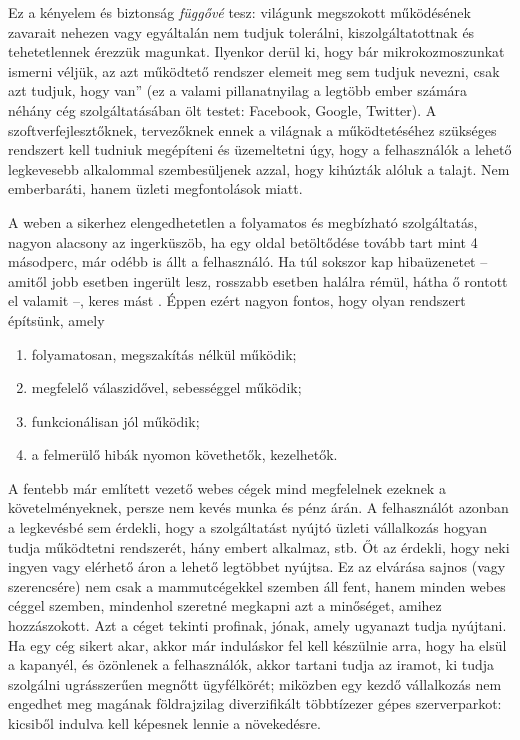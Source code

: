 \documentclass[12pt, a4paper, oneside]{book}
\begin{document}
Ez a kényelem és biztonság \textit{függővé} tesz: világunk megszokott
működésének zavarait nehezen vagy egyáltalán nem tudjuk tolerálni,
kiszolgáltatottnak és tehetetlennek érezzük magunkat. Ilyenkor derül ki, hogy
bár mikrokozmoszunkat ismerni véljük, az azt működtető rendszer elemeit meg sem
tudjuk nevezni, csak azt tudjuk, hogy \glqq{}van\textquotedblright{} (ez a
valami pillanatnyilag a legtöbb ember számára néhány cég szolgáltatásában ölt
testet: Facebook, Google, Twitter). A szoftverfejlesztőknek, tervezőknek ennek
a világnak a működtetéséhez szükséges rendszert kell tudniuk megépíteni és
üzemeltetni úgy, hogy a felhasználók a lehető legkevesebb alkalommal
szembesüljenek azzal, hogy kihúzták alóluk a talajt. Nem emberbaráti, hanem
üzleti megfontolások miatt.

A weben a sikerhez elengedhetetlen a folyamatos és megbízható szolgáltatás,
nagyon alacsony az ingerküszöb, ha egy oldal betöltődése tovább tart mint 4
másodperc, már odébb is állt a felhasználó.  Ha túl sokszor kap hibaüzenetet --
amitől jobb esetben ingerült lesz, rosszabb esetben halálra rémül, hátha ő
rontott el valamit --, keres mást \citep{AkamaiReport}.  Éppen ezért nagyon
fontos, hogy olyan rendszert építsünk, amely 

\begin{enumerate} 
  \item folyamatosan, megszakítás nélkül működik;
  \item megfelelő válaszidővel, sebességgel működik;
  \item funkcionálisan jól működik;
  \item a felmerülő hibák nyomon követhetők, kezelhetők.
\end{enumerate}

A fentebb már említett vezető webes cégek mind megfelelnek ezeknek a
követelményeknek, persze nem kevés munka és pénz árán. A felhasználót azonban a
legkevésbé sem érdekli, hogy a szolgáltatást nyújtó üzleti vállalkozás hogyan
tudja működtetni rendszerét, hány embert alkalmaz, stb. Őt az érdekli, hogy
neki ingyen vagy elérhető áron a lehető legtöbbet nyújtsa. Ez az elvárása
sajnos (vagy szerencsére) nem csak a mammutcégekkel szemben áll fent, hanem
minden webes céggel szemben, mindenhol szeretné megkapni azt a minőséget,
amihez hozzászokott. Azt a céget tekinti profinak, jónak, amely ugyanazt tudja
nyújtani. Ha egy cég sikert akar, akkor már induláskor fel kell készülnie arra,
hogy ha elsül a kapanyél, és özönlenek a felhasználók, akkor tartani tudja az
iramot, ki tudja szolgálni ugrásszerűen megnőtt ügyfélkörét; miközben egy kezdő
vállalkozás nem engedhet meg magának földrajzilag diverzifikált többtízezer
gépes szerverparkot: kicsiből indulva kell képesnek lennie a növekedésre.
\end{document}
